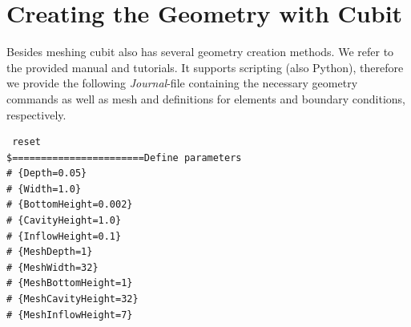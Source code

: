 \section{Creating the Geometry with Cubit}

Besides meshing cubit also has several geometry creation methods. We refer
to the provided manual and tutorials. It supports scripting (also Python),
therefore we provide the following \textit{Journal}-file containing the
necessary geometry commands as well as mesh and definitions for elements and
boundary conditions, respectively.

\begin{small} \begin{verbatim}
 reset
$=======================Define parameters
# {Depth=0.05}
# {Width=1.0}
# {BottomHeight=0.002}
# {CavityHeight=1.0}
# {InflowHeight=0.1}
# {MeshDepth=1}
# {MeshWidth=32}
# {MeshBottomHeight=1}
# {MeshCavityHeight=32}
# {MeshInflowHeight=7}


\end{verbatim}
\end{small}
